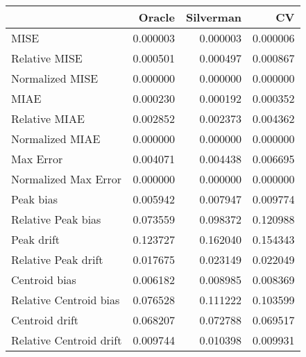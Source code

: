 \begin{tabular}{lrrr}
  \hline
 & Oracle & Silverman & CV \\ 
  \hline
MISE & 0.000003 & 0.000003 & 0.000006 \\ 
  Relative MISE & 0.000501 & 0.000497 & 0.000867 \\ 
  Normalized MISE & 0.000000 & 0.000000 & 0.000000 \\ 
  MIAE & 0.000230 & 0.000192 & 0.000352 \\ 
  Relative MIAE & 0.002852 & 0.002373 & 0.004362 \\ 
  Normalized MIAE & 0.000000 & 0.000000 & 0.000000 \\ 
  Max Error & 0.004071 & 0.004438 & 0.006695 \\ 
  Normalized Max Error & 0.000000 & 0.000000 & 0.000000 \\ 
  Peak bias & 0.005942 & 0.007947 & 0.009774 \\ 
  Relative Peak bias & 0.073559 & 0.098372 & 0.120988 \\ 
  Peak drift & 0.123727 & 0.162040 & 0.154343 \\ 
  Relative Peak drift & 0.017675 & 0.023149 & 0.022049 \\ 
  Centroid bias & 0.006182 & 0.008985 & 0.008369 \\ 
  Relative Centroid bias & 0.076528 & 0.111222 & 0.103599 \\ 
  Centroid drift & 0.068207 & 0.072788 & 0.069517 \\ 
  Relative Centroid drift & 0.009744 & 0.010398 & 0.009931 \\ 
   \hline
\end{tabular}
